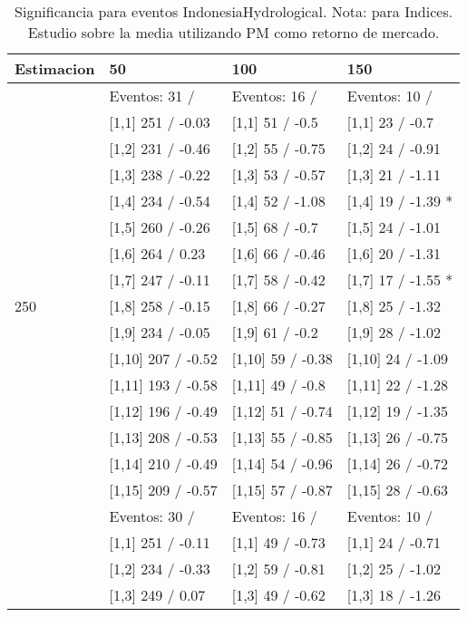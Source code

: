 \begin{table}

\caption{Significancia para eventos IndonesiaHydrological. Nota: para Indices. Estudio sobre la media utilizando PM como retorno de mercado.}
\centering
\begin{tabular}[t]{llll}
\toprule
Estimacion & 50 & 100 & 150\\
\midrule
 & Eventos:  31 / & Eventos:  16 / & Eventos:  10 /\\
 & {}[1,1] 251  / -0.03 & {}[1,1] 51  / -0.5 & {}[1,1] 23  / -0.7\\
 & {}[1,2] 231  / -0.46 & {}[1,2] 55  / -0.75 & {}[1,2] 24  / -0.91\\
 & {}[1,3] 238  / -0.22 & {}[1,3] 53  / -0.57 & {}[1,3] 21  / -1.11\\
 & {}[1,4] 234  / -0.54 & {}[1,4] 52  / -1.08 & {}[1,4] 19  / -1.39 *\\
\addlinespace
 & {}[1,5] 260  / -0.26 & {}[1,5] 68  / -0.7 & {}[1,5] 24  / -1.01\\
 & {}[1,6] 264  / 0.23 & {}[1,6] 66  / -0.46 & {}[1,6] 20  / -1.31\\
 & {}[1,7] 247  / -0.11 & {}[1,7] 58  / -0.42 & {}[1,7] 17  / -1.55 *\\
250 & {}[1,8] 258  / -0.15 & {}[1,8] 66  / -0.27 & {}[1,8] 25  / -1.32\\
 & {}[1,9] 234  / -0.05 & {}[1,9] 61  / -0.2 & {}[1,9] 28  / -1.02\\
\addlinespace
 & {}[1,10] 207  / -0.52 & {}[1,10] 59  / -0.38 & {}[1,10] 24  / -1.09\\
 & {}[1,11] 193  / -0.58 & {}[1,11] 49  / -0.8 & {}[1,11] 22  / -1.28\\
 & {}[1,12] 196  / -0.49 & {}[1,12] 51  / -0.74 & {}[1,12] 19  / -1.35\\
 & {}[1,13] 208  / -0.53 & {}[1,13] 55  / -0.85 & {}[1,13] 26  / -0.75\\
 & {}[1,14] 210  / -0.49 & {}[1,14] 54  / -0.96 & {}[1,14] 26  / -0.72\\
\addlinespace
 & {}[1,15] 209  / -0.57 & {}[1,15] 57  / -0.87 & {}[1,15] 28  / -0.63\\
 & Eventos:  30 / & Eventos:  16 / & Eventos:  10 /\\
 & {}[1,1] 251  / -0.11 & {}[1,1] 49  / -0.73 & {}[1,1] 24  / -0.71\\
 & {}[1,2] 234  / -0.33 & {}[1,2] 59  / -0.81 & {}[1,2] 25  / -1.02\\
 & {}[1,3] 249  / 0.07 & {}[1,3] 49  / -0.62 & {}[1,3] 18  / -1.26\\

\end{tabular}
\end{table}
